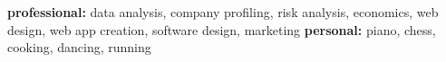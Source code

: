 \documentclass[]{friggeri-cv} %
\begin{document}
\textbf{professional:} data analysis, company profiling, risk analysis, economics, web design, web app creation, software design, marketing \textbf{personal:} piano, chess, cooking, dancing, running

%
%
%
%
%
%
%
%
\end{document}
